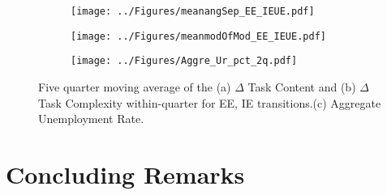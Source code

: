\documentclass[12pt,authoryear]{elsarticle}
\begin{document}
	\newpage
	\thispagestyle{empty}
	\begin{figure}
		\centering
		\begin{subfigure}[b]{1\textwidth}
			\texttt{[image: ../Figures/meanangSep\_EE\_IEUE.pdf]}
			\caption{}
			\label{fig:Ng1} 
		\end{subfigure}
		
		\begin{subfigure}[b]{1\textwidth}
			\texttt{[image: ../Figures/meanmodOfMod\_EE\_IEUE.pdf]}
			\caption{}
			\label{fig:Ng2}
		\end{subfigure}
				\begin{subfigure}[b]{1\textwidth}
			\texttt{[image: ../Figures/Aggre\_Ur\_pct\_2q.pdf]}
			\caption{}
			\label{fig:Ng3}
		\end{subfigure}
		\caption[Mean $\Delta$ Task Content and $\Delta$ Task Complexity by Transition Type]{Five quarter moving average of the (a) $\Delta$ Task Content and (b) $\Delta$ Task Complexity within-quarter for EE, IE transitions.(c) Aggregate Unemployment Rate.}
	\label{fig:TaskSkillsUR}
	\end{figure}


		\newpage
	\clearpage

	
	\section{Concluding Remarks}
	\label{sec:Conclusion}
	

	
\end{document}

